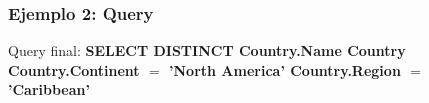 \begin{frame}[<+->]
\frametitle{Ejemplo 2: Query}
Query final:\newline
\Large{\textbf{{\color{purple}SELECT DISTINCT} Country.Name  Country  Country.Continent $=$ {\color{green}'North America'}  Country.Region $=$ {\color{green}'Caribbean'}}}

\end{frame}






